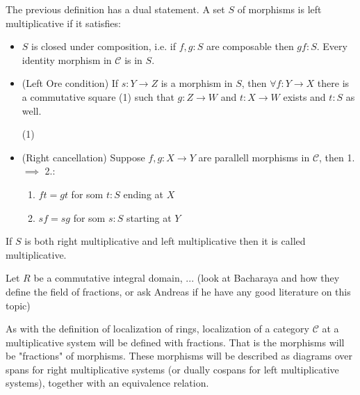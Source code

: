     \begin{remark}
        The previous definition has a dual statement. A set $S$ of morphisms is left multiplicative if it satisfies:
        \begin{itemize}
            \item $S$ is closed under composition, i.e. if $f,g : S$ are composable then $gf : S$. Every identity morphism in $\mathcal{C}$ is in $S$.
            \item (Left Ore condition) If $s : Y \rightarrow Z$ is a morphism in $S$, then $\forall f:Y\rightarrow X$ there is a commutative square (1) such that $g:Z\rightarrow W$ and $t:X\rightarrow W$ exists and $t:S$ as well.
            \begin{center}
                (1)
            \end{center}
            \item (Right cancellation) Suppose $f,g:X\rightarrow Y$ are parallell morphisms in $\mathcal{C}$, then 1. $\implies$ 2.:
            \begin{enumerate}
                \item $ft = gt$ for som $t:S$ ending at $X$
                \item $sf = sg$ for som $s:S$ starting at $Y$
            \end{enumerate}
        \end{itemize}
        If $S$ is both right multiplicative and left multiplicative then it is called multiplicative.
    \end{remark}

    \begin{prototype}
         Let $R$ be a commutative integral domain, ... (look at Bacharaya and how they define the field of fractions, or ask Andreas if he have any good literature on this topic)
    \end{prototype}

    As with the definition of localization of rings, localization of a category $\mathcal{C}$ at a multiplicative system will be defined with fractions. That is the morphisms will be "fractions" of morphisms. These morphisms will be described as diagrams over spans for right multiplicative systems (or dually cospans for left multiplicative systems), together with an equivalence relation.

